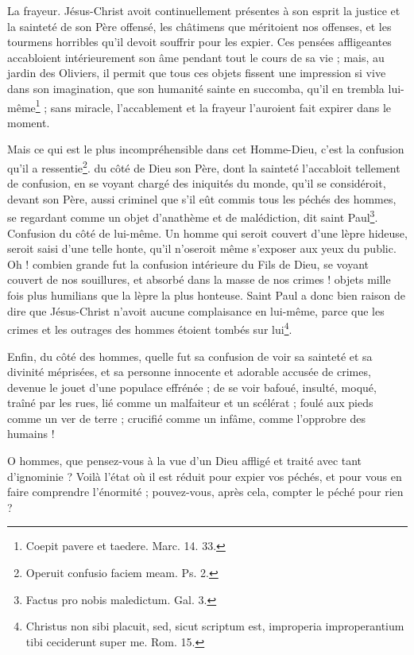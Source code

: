 \documentclass[instructions.tex]{subfiles}
\begin{document}
\tertio La frayeur. Jésus-Christ avoit continuellement présentes à son esprit la justice et la sainteté de son Père offensé, les châtimens que méritoient nos offenses, et les tourmens horribles qu’il devoit souffrir pour les expier. Ces pensées affligeantes accabloient intérieurement son âme pendant tout le cours de sa vie ; mais, au jardin des Oliviers, il permit que tous ces objets fissent une impression si vive dans son imagination, que son humanité sainte en succomba, qu’il en trembla lui-même\footnote{Coepit pavere et taedere. Marc. 14. 33.} ; sans miracle, l’accablement et la frayeur l’auroient fait expirer dans le moment.

\quarto Mais ce qui est le plus incompréhensible dans cet Homme-Dieu, c’est la confusion qu’il a ressentie\footnote{Operuit confusio faciem meam. Ps. 2.}. \primo du côté de Dieu son Père, dont la sainteté l’accabloit tellement de confusion, en se voyant chargé des iniquités du monde, qu’il se considéroit, devant son Père, aussi criminel que s’il eût commis tous les péchés des hommes, se regardant comme un objet d’anathème et de malédiction, dit saint Paul\footnote{Factus pro nobis maledictum. Gal. 3.}. \secundo Confusion du côté de lui-même. Un homme qui seroit couvert d’une lèpre hideuse, seroit saisi d’une telle honte, qu’il n’oseroit même s’exposer aux yeux du public. Oh ! combien grande fut la confusion intérieure du Fils de Dieu, se voyant couvert de nos souillures, et absorbé dans la masse de nos crimes ! objets mille fois plus humilians que la lèpre la plus honteuse. Saint Paul a donc bien raison de dire que Jésus-Christ n’avoit aucune complaisance en lui-même, parce que les crimes et les outrages des hommes étoient tombés sur lui\footnote{Christus non sibi placuit, sed, sicut scriptum est, improperia improperantium tibi ceciderunt super me. Rom. 15.}.

\tertio Enfin, du côté des hommes, quelle fut sa confusion de voir sa sainteté et sa divinité méprisées, et sa personne innocente et adorable accusée de crimes, devenue le jouet d’une populace effrénée ; de se voir bafoué, insulté, moqué, traîné par les rues, lié comme un malfaiteur et un scélérat ; foulé aux pieds comme un ver de terre ; crucifié comme un infâme, comme l’opprobre des humains !

O hommes, que pensez-vous à la vue d’un Dieu affligé et traité avec tant d’ignominie ? Voilà l’état où il est réduit pour expier vos péchés, et pour vous en faire comprendre l’énormité ; pouvez-vous, après cela, compter le péché pour rien ?
\end{document}
